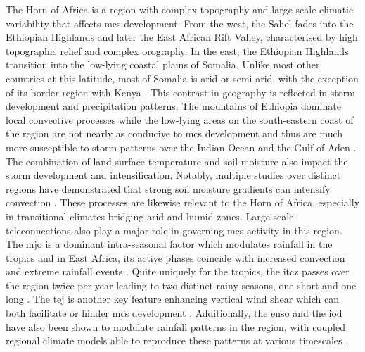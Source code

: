 The Horn of Africa is a region with complex topography and large-scale climatic variability that affects \acrshort{mcs} development. From the west, the Sahel fades into the Ethiopian Highlands and later the East African Rift Valley, characterised by high topographic relief and complex orography. In the east, the Ethiopian Highlands transition into the low-lying coastal plains of Somalia. Unlike most other countries at this latitude, most of Somalia is arid or semi-arid, with the exception of its border region with Kenya \citep{Beck2023}. This contrast in geography is reflected in storm development and precipitation patterns. The mountains of Ethiopia dominate local convective processes \citep{Negash2024} while the low-lying areas on the south-eastern coast of the region are not nearly as conducive to \acrshort{mcs} development and thus are much more susceptible to storm patterns over the Indian Ocean and the Gulf of Aden \citep{Camberlin2024}. The combination of land surface temperature and soil moisture also impact the storm development and intensification. Notably, multiple studies over distinct regions have demonstrated that strong soil moisture gradients can intensify convection \citep{Barton2021,Klein2020,Taylor2017}. These processes are likewise relevant to the Horn of Africa, especially in transitional climates bridging arid and humid zones. Large-scale \glspl{teleconnection} also play a major role in governing \acrshort{mcs} activity in this region. The \acrfull{mjo} is a dominant intra-seasonal factor which modulates rainfall in the tropics and in East Africa, its active phases coincide with increased convection and extreme rainfall events \citep{Camberlin2019,Ochieng2023,Pohl2006}. Quite uniquely for the tropics, the \acrfull{itcz} passes over the region twice per year leading to two distinct rainy seasons, one short and one long \citep{Palmer2023,Tefera2025}. The \acrfull{tej} is another key feature enhancing vertical wind shear which can both facilitate or hinder \acrshort{mcs} development \citep{Farnsworth2011,Vashisht2021}. Additionally, the \acrfull{enso} and the \acrfull{iod} have also been shown to modulate rainfall patterns in the region, with coupled regional climate models able to reproduce these patterns at various timescales \citep{Dubache2019,Endris2019,Vashisht2021,Zaroug2014}. 

